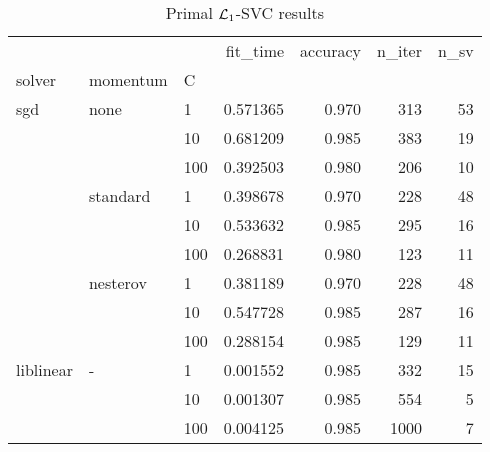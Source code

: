 \begin{table}[H]
\centering
\caption{Primal $\protect \mathcal{L}_1$-SVC results}
\label{primal_l1_svc_cv_results}
\begin{tabular}{lllrrrr}
\toprule
          &   &     &  fit\_time &  accuracy &  n\_iter &  n\_sv \\
solver & momentum & C &           &           &         &       \\
\midrule
sgd & none & 1   &  0.571365 &     0.970 &     313 &    53 \\
          &   & 10  &  0.681209 &     0.985 &     383 &    19 \\
          &   & 100 &  0.392503 &     0.980 &     206 &    10 \\
          & standard & 1   &  0.398678 &     0.970 &     228 &    48 \\
          &   & 10  &  0.533632 &     0.985 &     295 &    16 \\
          &   & 100 &  0.268831 &     0.980 &     123 &    11 \\
          & nesterov & 1   &  0.381189 &     0.970 &     228 &    48 \\
          &   & 10  &  0.547728 &     0.985 &     287 &    16 \\
          &   & 100 &  0.288154 &     0.985 &     129 &    11 \\
liblinear & - & 1   &  0.001552 &     0.985 &     332 &    15 \\
          &   & 10  &  0.001307 &     0.985 &     554 &     5 \\
          &   & 100 &  0.004125 &     0.985 &    1000 &     7 \\
\bottomrule
\end{tabular}
\end{table}
